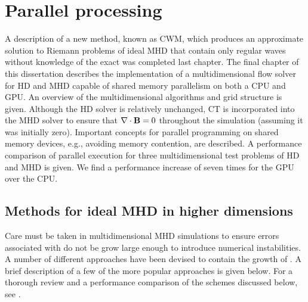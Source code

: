 %
%


\chapter[Parallel processing]{Parallel processing}
\label{chp:gpu}

A description of a new method, known as CWM, which produces an approximate solution to Riemann problems of ideal MHD that contain only regular waves without knowledge of the exact was completed last chapter.  The final chapter of this dissertation describes the implementation of a multidimensional flow solver for HD and MHD capable of shared memory parallelism on both a CPU and GPU.  An overview of the multidimensional algorithms and grid structure is given.  Although the HD solver is relatively unchanged, CT \citep{Evans:1988} is incorporated into the MHD solver to ensure that $\mathbf{\nabla} \cdot \mathbf{B} = 0$ throughout the simulation (assuming it was initially zero).  Important concepts for parallel programming on shared memory devices, e.g., avoiding memory contention, are described.  A performance comparison of parallel execution for three multidimensional test problems of HD and MHD is given.  We find a performance increase of  seven times for the GPU over the CPU.  

\section[Methods for ideal MHD in higher dimensions]{Methods for ideal MHD in higher dimensions}          
\label{sec:2d_mhd}

Care must be taken in multidimensional MHD simulations to ensure errors associated with  do not be grow large enough to introduce numerical instabilities.  A number of different approaches have been devised to contain the growth of .  A brief description of a few of the more popular approaches is given below.  For a thorough review and a performance comparison of the schemes discussed below, see \citep{Toth:2000}.  


